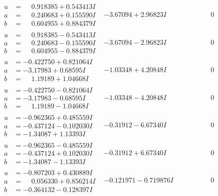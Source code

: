 \documentclass[1p]{elsarticle_modified}
\theoremstyle{definition}
\begin{document}
$$\begin{array}{c|c|c}
\begin{aligned}
u &= \phantom{-}0.918385 + 0.543413 I \\
a &= \phantom{-}0.240683 + 0.155590 I \\
b &= \phantom{-}0.604955 + 0.884379 I\end{aligned}
 & -3.67094 + 2.96823 I & \phantom{-0.000000 } 0 \\ \hline\begin{aligned}
u &= \phantom{-}0.918385 - 0.543413 I \\
a &= \phantom{-}0.240683 - 0.155590 I \\
b &= \phantom{-}0.604955 - 0.884379 I\end{aligned}
 & -3.67094 - 2.96823 I & \phantom{-0.000000 } 0 \\ \hline\begin{aligned}
u &= -0.422750 + 0.821064 I \\
a &= -3.17983 + 0.68595 I \\
b &= \phantom{-}1.19189 + 1.04668 I\end{aligned}
 & -1.03348 + 4.20848 I & \phantom{-0.000000 } 0 \\ \hline\begin{aligned}
u &= -0.422750 - 0.821064 I \\
a &= -3.17983 - 0.68595 I \\
b &= \phantom{-}1.19189 - 1.04668 I\end{aligned}
 & -1.03348 - 4.20848 I & \phantom{-0.000000 } 0 \\ \hline\begin{aligned}
u &= -0.962365 + 0.485559 I \\
a &= -0.437124 - 0.102030 I \\
b &= -1.34087 + 1.13393 I\end{aligned}
 & -0.31912 - 6.67340 I & \phantom{-0.000000 } 0 \\ \hline\begin{aligned}
u &= -0.962365 - 0.485559 I \\
a &= -0.437124 + 0.102030 I \\
b &= -1.34087 - 1.13393 I\end{aligned}
 & -0.31912 + 6.67340 I & \phantom{-0.000000 } 0 \\ \hline\begin{aligned}
u &= -0.807203 + 0.430889 I \\
a &= \phantom{-}0.056330 + 0.856214 I \\
b &= -0.364132 - 0.128397 I\end{aligned}
 & -0.121971 - 0.719876 I & \phantom{-0.000000 } 0 \\ \hline\begin{aligned}

\end{aligned}
\end{array}$$
\end{document}
